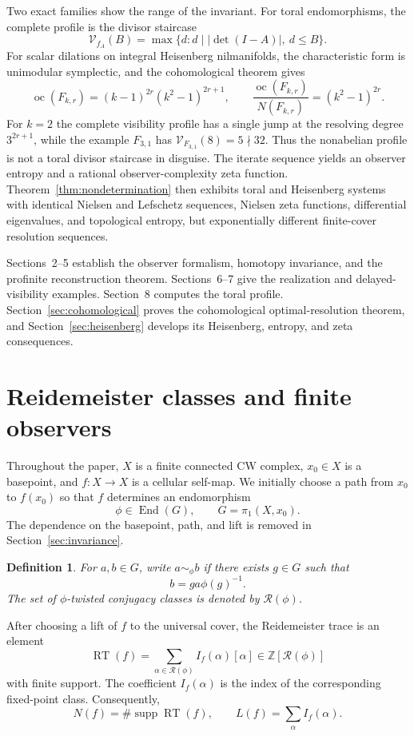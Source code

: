 \documentclass[11pt]{article}
\newtheorem{definition}[theorem]{Definition}
\DeclareMathOperator{\supp}{supp}
\DeclareMathOperator{\End}{End}
\DeclareMathOperator{\oc}{oc}
\newcommand{\RT}{\operatorname{RT}}
\newcommand{\RN}{\mathcal R}
\newcommand{\VN}{\mathcal V}
\newcommand{\Z}{\mathbb Z}
\begin{document}
Two exact families show the range of the invariant.  For toral endomorphisms,
the complete profile is the divisor staircase
\[
  \VN_{f_A}(B)=\max\{d:d\mid |\det(I-A)|,\ d\le B\}.
\]
For scalar dilations on integral Heisenberg nilmanifolds, the characteristic
form is unimodular symplectic, and the cohomological theorem gives
\[
  \oc(F_{k,r})=(k-1)^{2r}(k^2-1)^{2r+1},
  \qquad
  \frac{\oc(F_{k,r})}{N(F_{k,r})}=(k^2-1)^{2r}.
\]
For $k=2$ the complete visibility profile has a single jump at the resolving
degree $3^{2r+1}$, while the example $F_{3,1}$ has
$\VN_{F_{3,1}}(8)=5\nmid32$.  Thus the nonabelian profile is not a toral
divisor staircase in disguise.  The iterate sequence yields an observer entropy and a rational
observer-complexity zeta function.  Theorem~\ref{thm:nondetermination} then
exhibits toral and Heisenberg systems with identical Nielsen and Lefschetz
sequences, Nielsen zeta functions, differential eigenvalues, and topological
entropy, but exponentially different finite-cover resolution sequences.

Sections~2--5 establish the observer formalism, homotopy invariance, and the
profinite reconstruction theorem.  Sections~6--7 give the realization and
delayed-visibility examples.  Section~8 computes the toral profile.
Section~\ref{sec:cohomological} proves the cohomological optimal-resolution
theorem, and Section~\ref{sec:heisenberg} develops its Heisenberg, entropy,
and zeta consequences.

\section{Reidemeister classes and finite observers}

Throughout the paper, $X$ is a finite connected CW complex, $x_0\in X$ is a
basepoint, and $f\colon X\to X$ is a cellular self-map.  We initially choose a
path from $x_0$ to $f(x_0)$ so that $f$ determines an endomorphism
\[
  \phi\in\End(G),\qquad G=\pi_1(X,x_0).
\]
The dependence on the basepoint, path, and lift is removed in
Section~\ref{sec:invariance}.

\begin{definition}
For $a,b\in G$, write $a\sim_\phi b$ if there exists $g\in G$ such that
\[
  b=g a\phi(g)^{-1}.
\]
The set of $\phi$-twisted conjugacy classes is denoted by $\RN(\phi)$.
\end{definition}

After choosing a lift of $f$ to the universal cover, the Reidemeister trace is
an element
\[
  \RT(f)=\sum_{\alpha\in\RN(\phi)} I_f(\alpha)[\alpha]
  \in \Z[\RN(\phi)]
\]
with finite support.  The coefficient $I_f(\alpha)$ is the index of the
corresponding fixed-point class.  Consequently,
\[
  N(f)=\#\supp\RT(f),
  \qquad
  L(f)=\sum_{\alpha} I_f(\alpha).
\]
\end{document}
